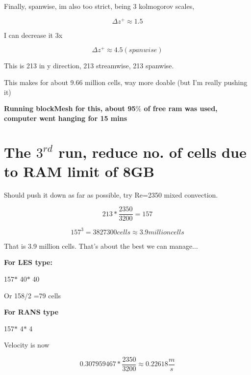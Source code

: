 \documentclass[12pt]{article}
\renewcommand{\_}{\kern-1.5pt\textunderscore\kern-1.5pt}
\begin{document}
Finally, spanwise, im also too strict, being 3 kolmogorov scales,\par

 \[  \Delta z^{+} \approx 1.5 \] \par

I can decrease it 3x\par

 \[  \Delta z^{+} \approx 4.5  \left( spanwise \right)  \] \par


\vspace{\baselineskip}
This is 213 in y direction, 213 streamwise, 213 spanwise.\par

This makes for about 9.66 million cells, way more doable (but I’m really pushing it)\par

\textbf{Running blockMesh for this, about 95$\%$  of free ram was used, computer went hanging for 15 mins}\par

\section{The $3^{rd}$ run, reduce no. of cells due to RAM limit of 8GB}
Should push it down as far as possible, try Re=2350 mixed convection.\par

 \[ 213\ast\frac{2350}{3200}=157 \] \par

 \[ 157^{3}=3827300 cells \approx 3.9 million cells \] \par

That is 3.9 million cells. That’s about the best we can manage$ \ldots $ \par

\textbf{For LES type:}\par

157$\ast$ 40$\ast$ 40 \par

 Or 158/2 =79 cells\par

\textbf{For RANS type}\par

157$\ast$ 4$\ast$ 4 \par

Velocity is now\par

 \[ 0.307959467\ast\frac{2350}{3200} \approx 0.22618\frac{m}{s} \] \par
\end{document}
